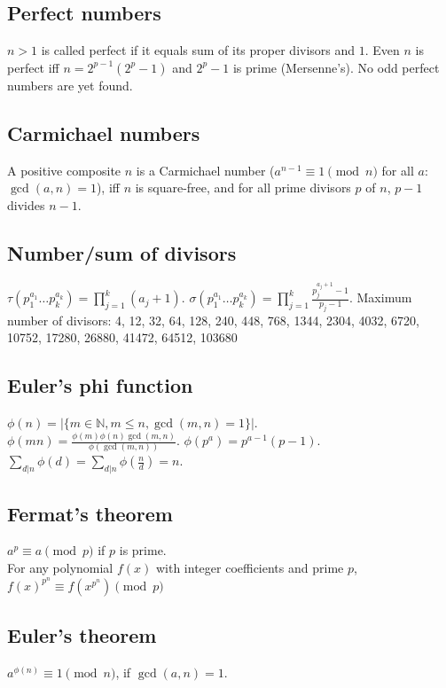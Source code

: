 \documentclass[12pt]{extarticle}
\begin{document}
\begin{multicols*}{2}
\subsection{Perfect numbers}  $n>1$ is called perfect if it equals
sum of its proper divisors and $1$.  Even $n$ is perfect iff $n = 2^{p-1} (2^p - 1)$
and $2^p - 1$ is prime (Mersenne's). No odd perfect numbers are yet found.

\subsection{Carmichael numbers}
A positive composite $n$ is a Carmichael number
($a^{n-1} \equiv 1 \pmod{n}$ for all $a$: $\gcd(a,n)=1$),
iff $n$ is square-free, and for all prime divisors $p$ of $n$, $p-1$ divides $n-1$.

\subsection{Number/sum of divisors}
$\tau(p_1^{a_1} \dots p_k^{a_k}) = \prod_{j=1}^k (a_j+1)$. \quad
$\sigma(p_1^{a_1} \dots p_k^{a_k}) = \prod_{j=1}^k \frac{p_j^{a_j+1}-1}{p_j-1}$.
Maximum number of divisors: 4, 12, 32, 64, 128, 240, 448, 768, 1344, 2304, 4032, 6720, 10752, 17280, 26880, 41472, 64512, 103680

\subsection{Euler's phi function}
$\phi(n)=|\{m \in {\mathbb N}, m \le n, \gcd(m, n) = 1 \}|$. \\

$\phi(mn) = \frac{\phi(m) \phi(n) \gcd(m,n)}{\phi(\gcd(m,n))}$. \quad
$\phi(p^a) = p^{a-1} (p-1)$. \quad \\

$\sum_{d|n} \phi(d) = \sum_{d|n} \phi(\frac{n}{d}) = n$.

\subsection{Fermat's theorem}  $a^p \equiv a \pmod{p}$ if $p$ is prime. \\
For any polynomial $f(x)$ with integer coefficients and prime $p$,
$f(x)^{p^n} \equiv f(x^{p^n}) \pmod{p}$
\subsection{Euler's theorem} $a^{\phi(n)} \equiv 1\pmod{n}$, if $\gcd(a,n)=1$. \\

\end{multicols*}
\end{document}
